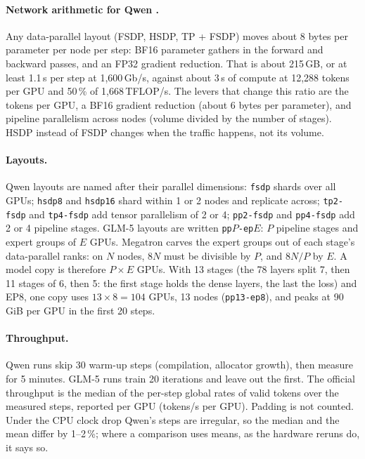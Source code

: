 \paragraph{Network arithmetic for Qwen \est{}.} Any data-parallel layout (FSDP, HSDP, TP + FSDP) moves
about 8 bytes per parameter per node per step: BF16 parameter gathers in the forward and backward
passes, and an FP32 gradient reduction. That is about 215\,GB, or at least 1.1\,s per step at 1,600\,Gb/s,
against about 3\,s of compute at 12{,}288 tokens per GPU and 50\,\% of 1{,}668\,TFLOP/s. The levers that
change this ratio are the tokens per GPU, a BF16 gradient reduction (about 6 bytes per parameter), and
pipeline parallelism across nodes (volume divided by the number of stages). HSDP instead of FSDP changes
when the traffic happens, not its volume.

\paragraph{Layouts.} Qwen layouts are named after their parallel dimensions: \texttt{fsdp} shards over
all GPUs; \texttt{hsdp8} and \texttt{hsdp16} shard within 1 or 2 nodes and replicate across;
\texttt{tp2-fsdp} and \texttt{tp4-fsdp} add tensor parallelism of 2 or 4; \texttt{pp2-fsdp} and
\texttt{pp4-fsdp} add 2 or 4 pipeline stages. GLM-5 layouts are written \texttt{pp}$P$\texttt{-ep}$E$:
$P$ pipeline stages and expert groups of $E$ GPUs. Megatron carves the expert groups out of each stage's
data-parallel ranks: on $N$ nodes, $8N$ must be divisible by $P$, and $8N/P$ by $E$. A model copy is
therefore $P\times E$ GPUs. With 13 stages (the 78 layers split 7, then 11 stages of 6, then 5: the first
stage holds the dense layers, the last the loss) and EP8, one copy uses $13\times8=104$ GPUs, 13 nodes (\texttt{pp13-ep8}), and peaks at 90\,GiB per GPU in the first 20 steps.

\paragraph{Throughput.} Qwen runs skip 30 warm-up steps (compilation, allocator growth), then measure for
5 minutes. GLM-5 runs train 20 iterations and leave out the first. The official throughput is the median
of the per-step global rates of valid tokens over the measured steps, reported per GPU (tokens/s per GPU). Padding is not counted. Under the CPU clock drop Qwen's steps are irregular, so the median and the mean differ by 1--2\,\%; where a comparison uses means, as the hardware reruns do, it says so.

